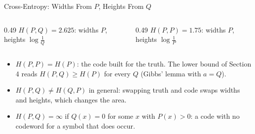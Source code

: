 \begin{frame}{Cross-Entropy: Widths From $P$, Heights From $Q$}
  \small
  \begin{columns}[T]
    \begin{column}{0.49\textwidth}
      \centering
      $H(P,Q)=2.625$: widths $P$, heights $\log\tfrac1Q$\par\smallskip
    \end{column}
    \begin{column}{0.49\textwidth}
      \centering
      $H(P,P)=1.75$: widths $P$, heights $\log\tfrac1P$\par\smallskip
    \end{column}
  \end{columns}
  \medskip
  \begin{itemize}
    \item $H(P,P)=H(P)$: the code built for the truth. The lower bound of Section 4 reads $H(P,Q)\ge H(P)$ for every $Q$ (Gibbs' lemma with $a=Q$).
    \item $H(P,Q)\ne H(Q,P)$ in general: swapping truth and code swaps widths and heights, which changes the area.
    \item $H(P,Q)=\infty$ if $Q(x)=0$ for some $x$ with $P(x)>0$: a code with no codeword for a symbol that does occur.
  \end{itemize}
\end{frame}

